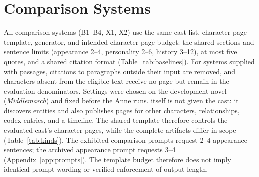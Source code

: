 \section{Comparison Systems}
\label{app:baselines}

All comparison systems (B1--B4, X1, X2) use the same cast list, character-page template,
generator, and intended character-page budget:
the shared sections and sentence limits (appearance 2--4, personality 2--6, history 3--12), at most five
quotes, and a shared citation format (Table~\ref{tab:baselines}). For systems supplied with
passages, citations to paragraphs outside their input are removed, and characters absent
from the eligible text receive no page but remain in the evaluation denominators. Settings were chosen on the development novel
(\emph{Middlemarch}) and fixed before the Anne runs. \sys itself is not given the cast: it
discovers entities and also publishes pages for other characters, relationships,
codex entries, and a timeline. The shared template therefore controls the evaluated cast's
character pages, while the complete artifacts differ in scope (Table~\ref{tab:kinds}).
The exhibited comparison prompts request 2--4 appearance sentences; the archived \sys
appearance prompt requests 3--4 (Appendix~\ref{app:prompts}). The template budget therefore
does not imply identical prompt wording or verified enforcement of output length.

